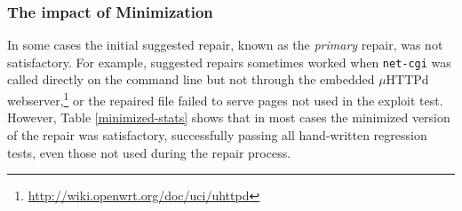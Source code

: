 \documentclass{sig-alternate}
\begin{document}
\subsubsection{The impact of Minimization}
\label{minimization}

In some cases the initial suggested repair, known as the
\emph{primary} repair, was not satisfactory.  For
example, suggested repairs sometimes worked when \texttt{net-cgi} was
called directly on the command line but not through the embedded
$\mu$HTTPd webserver,\footnote{\url{http://wiki.openwrt.org/doc/uci/uhttpd}}
or the repaired file failed to serve pages not used in the
exploit test.  However, Table \ref{minimized-stats} shows that in most
cases the minimized version of the repair was satisfactory,
successfully passing all hand-written regression tests, even those not used
during the repair process.

\begin{table}[htb]
\centering
{}
\caption{\label{minimized-stats}The
evolved repair before and after minimization.  In these columns ``Full''
refers to evolved solutions before minimization and ``Min'' refers to
solutions after.  Columns labeled ``Diff'' report the number
of unified diff windows against the original program data. The columns
labeled ``Fit'' report fitness as measured with a full regression test
suite, including the exploit tests.  The maximum possible fitness
score is 22, indicating a successful repair.}
\end{table}
\end{document}
